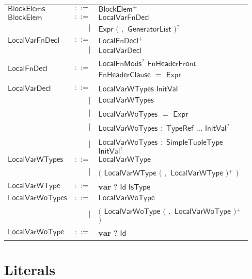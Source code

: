  
\begin{longtable}[l]{p{3cm}rl}
$\mathsf{BlockElems}$ &  $\mathsf{::=}$  & $\mathsf{BlockElem}$$^+$ \\
$\mathsf{BlockElem}$ &  $\mathsf{::=}$  & $\mathsf{LocalVarFnDecl}$ \\
 & $\big|$ &  $\mathsf{Expr}$ $\big($  $\mathbf{,}$ $\mathsf{GeneratorList}$ $\big)$$^?$ \\
$\mathsf{LocalVarFnDecl}$ &  $\mathsf{::=}$  & $\mathsf{LocalFnDecl}$$^+$ \\
 & $\big|$ &  $\mathsf{LocalVarDecl}$ \\
$\mathsf{LocalFnDecl}$ &  $\mathsf{::=}$  & $\mathsf{LocalFnMods}$$^?$ $\mathsf{FnHeaderFront}$ $\mathsf{FnHeaderClause}$ $\mathbf{=}$ $\mathsf{Expr}$ \\
$\mathsf{LocalVarDecl}$ &  $\mathsf{::=}$  & $\mathsf{LocalVarWTypes}$ $\mathsf{InitVal}$ \\
 & $\big|$ &  $\mathsf{LocalVarWTypes}$ \\
 & $\big|$ &  $\mathsf{LocalVarWoTypes}$ $\mathbf{=}$ $\mathsf{Expr}$ \\
 & $\big|$ &  $\mathsf{LocalVarWoTypes}$ $\mathbf{:}$ $\mathsf{TypeRef}$ $\mathbf{...}$ $\mathsf{InitVal}$$^?$ \\
 & $\big|$ &  $\mathsf{LocalVarWoTypes}$ $\mathbf{:}$ $\mathsf{SimpleTupleType}$ $\mathsf{InitVal}$$^?$ \\
$\mathsf{LocalVarWTypes}$ &  $\mathsf{::=}$  & $\mathsf{LocalVarWType}$ \\
 & $\big|$ &  $\big($  $\mathsf{LocalVarWType}$ $\big($  $\mathbf{,}$ $\mathsf{LocalVarWType}$ $\big)$$^+$ $\big)$ \\
$\mathsf{LocalVarWType}$ &  $\mathsf{::=}$  & $\mathbf{var}$ $\mathbf{?}$ $\mathsf{Id}$ $\mathsf{IsType}$ \\
$\mathsf{LocalVarWoTypes}$ &  $\mathsf{::=}$  & $\mathsf{LocalVarWoType}$ \\
 & $\big|$ &  $\big($  $\mathsf{LocalVarWoType}$ $\big($  $\mathbf{,}$ $\mathsf{LocalVarWoType}$ $\big)$$^+$ $\big)$ \\
$\mathsf{LocalVarWoType}$ &  $\mathsf{::=}$  & $\mathbf{var}$ $\mathbf{?}$ $\mathsf{Id}$ \\
\end{longtable} \hfill 

\section{Literals} 

